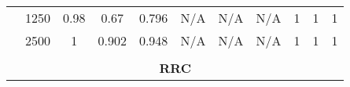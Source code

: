 \begin{table*}[]
{\begin{tabular}{ccccccccccc}
			\multicolumn{1}{|c|}{}                                            & \multicolumn{1}{c|}{1250}          & \multicolumn{1}{c|}{0.98}                    & \multicolumn{1}{c|}{0.67}                 & \multicolumn{1}{c|}{0.796}            & \multicolumn{1}{c|}{N/A}                        & \multicolumn{1}{c|}{N/A}                     & \multicolumn{1}{c|}{N/A}                 & \multicolumn{1}{c|}{1}                      & \multicolumn{1}{c|}{1}                   & \multicolumn{1}{c|}{1}               \\ \cline{2-11}
			\multicolumn{1}{|c|}{}                                            & \multicolumn{1}{c|}{2500}          & \multicolumn{1}{c|}{1}                       & \multicolumn{1}{c|}{0.902}                & \multicolumn{1}{c|}{0.948}            & \multicolumn{1}{c|}{N/A}                        & \multicolumn{1}{c|}{N/A}                     & \multicolumn{1}{c|}{N/A}                 & \multicolumn{1}{c|}{1}                      & \multicolumn{1}{c|}{1}                   & \multicolumn{1}{c|}{1}               \\ \cline{1-11}
			&                                    &                                              &                                           &                                       &                                               &                                            &                                        &                                             &                                          &                                      \\ \hline
			\multicolumn{11}{|c|}{\textbf{RRC}}                                                                                                                                                                                                                                                                                                                                                                                                                                                                             \\ \hline

\end{tabular}}
\end{table*}
